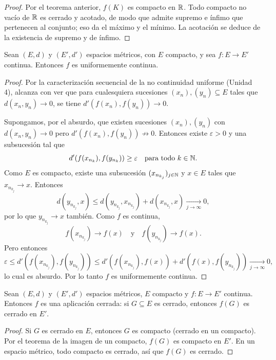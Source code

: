 \begin{proof}
Por el teorema anterior, $f(K)$ es compacto en $\mathbb{R}$. Todo compacto
no vacío de $\mathbb{R}$ es cerrado y acotado, de modo que admite supremo e
ínfimo que pertenecen al conjunto; eso da el máximo y el mínimo.
La acotación se deduce de la existencia de supremo y de ínfimo.
\end{proof}

\begin{teo}
Sean $(E,d)$ y $(E',d')$ espacios métricos, con $E$ compacto, y sea
$f : E \to E'$ continua. Entonces $f$ es uniformemente continua.
\end{teo}

\begin{proof}
Por la caracterización secuencial de la no continuidad uniforme (Unidad
4), alcanza con ver que para cualesquiera sucesiones $(x_n),(y_n)
\subseteq E$ tales que $d(x_n,y_n)\to 0$, se tiene
$d'(f(x_n),f(y_n))\to 0$.

Supongamos, por el absurdo, que existen sucesiones $(x_n),(y_n)$ con
$d(x_n,y_n)\to 0$ pero $d'(f(x_n),f(y_n)) \not\to 0$. Entonces existe
$\varepsilon>0$ y una subsucesión tal que
\[
d'(f(x_{n_k}),f(y_{n_k})) \ge \varepsilon \quad \text{para todo } k\in\mathbb{N}.
\]
Como $E$ es compacto, existe una subsucesión $(x_{n_{k_j}})_{j\in\mathbb{N}}$ y
$x\in E$ tales que $x_{n_{k_j}}\to x$. Entonces
\[
d(y_{n_{k_j}},x) \le d(y_{n_{k_j}},x_{n_{k_j}}) + d(x_{n_{k_j}},x)
\xrightarrow[j\to\infty]{} 0,
\]
por lo que $y_{n_{k_j}}\to x$ también. Como $f$ es continua,
\[
f(x_{n_{k_j}}) \to f(x) \quad\text{y}\quad f(y_{n_{k_j}}) \to f(x).
\]
Pero entonces
\[
\varepsilon \le d'(f(x_{n_{k_j}}),f(y_{n_{k_j}}))
\le d'(f(x_{n_{k_j}}),f(x)) + d'(f(x),f(y_{n_{k_j}}))
\xrightarrow[j\to\infty]{} 0,
\]
lo cual es absurdo. Por lo tanto $f$ es uniformemente continua.
\end{proof}

\begin{cor}
Sean $(E,d)$ y $(E',d')$ espacios métricos, $E$ compacto y
$f : E \to E'$ continua. Entonces $f$ es una aplicación cerrada:
si $G \subseteq E$ es cerrado, entonces $f(G)$ es cerrado en $E'$.
\end{cor}

\begin{proof}
Si $G$ es cerrado en $E$, entonces $G$ es compacto (cerrado en un
compacto). Por el teorema de la imagen de un compacto, $f(G)$ es
compacto en $E'$. En un espacio métrico, todo compacto es cerrado,
así que $f(G)$ es cerrado.
\end{proof}

